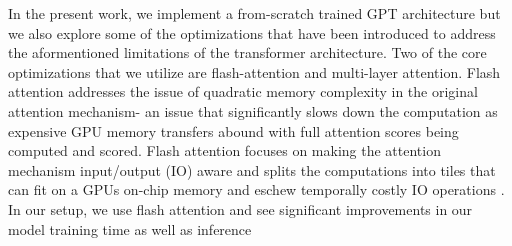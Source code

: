 In the present work, we implement a from-scratch trained GPT architecture but we also explore some of the 
optimizations that have been introduced to address the aformentioned limitations of the transformer architecture. 
Two of the core optimizations that we utilize are flash-attention and multi-layer attention. Flash attention  addresses
the issue of quadratic memory complexity in the original attention mechanism- an issue that significantly slows down 
the computation as expensive GPU memory transfers abound with full attention scores being computed and scored. 
Flash attention focuses on making the attention mechanism input/output (IO) aware and splits the computations 
into tiles that can fit on a GPUs on-chip memory and eschew temporally costly IO operations \cite{dao2022flashattentionfastmemoryefficientexact}. In our setup, we 
use flash attention and see significant improvements in our model training time as well as inference 
